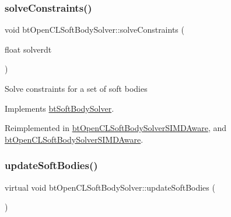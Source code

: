 \mbox{\label{classbtOpenCLSoftBodySolver_a24daba36a553aeb1d49158cd804e039a}} 
\subsubsection{\texorpdfstring{solve\+Constraints()}{solveConstraints()}\hspace{0.1cm}{\footnotesize\ttfamily [2/2]}}
{\footnotesize\ttfamily void bt\+Open\+C\+L\+Soft\+Body\+Solver\+::solve\+Constraints (\begin{DoxyParamCaption}\item[{float}]{solverdt }\end{DoxyParamCaption})\hspace{0.3cm}{\ttfamily [virtual]}}

Solve constraints for a set of soft bodies 

Implements \hyperlink{classbtSoftBodySolver_a5e71a2a32786574bedf409ba822980eb}{bt\+Soft\+Body\+Solver}.



Reimplemented in \hyperlink{classbtOpenCLSoftBodySolverSIMDAware_a38d944c9dcaa0579e001f93da1b5244d}{bt\+Open\+C\+L\+Soft\+Body\+Solver\+S\+I\+M\+D\+Aware}, and \hyperlink{classbtOpenCLSoftBodySolverSIMDAware_aac2e9d5582da958b0943b6e04f7f4c5a}{bt\+Open\+C\+L\+Soft\+Body\+Solver\+S\+I\+M\+D\+Aware}.

\mbox{\label{classbtOpenCLSoftBodySolver_a557948307d1eb34fa1af3d091ca243ab}} 
\subsubsection{\texorpdfstring{update\+Soft\+Bodies()}{updateSoftBodies()}\hspace{0.1cm}{\footnotesize\ttfamily [1/2]}}
{\footnotesize\ttfamily virtual void bt\+Open\+C\+L\+Soft\+Body\+Solver\+::update\+Soft\+Bodies (\begin{DoxyParamCaption}{ }\end{DoxyParamCaption})\hspace{0.3cm}{\ttfamily [virtual]}}

